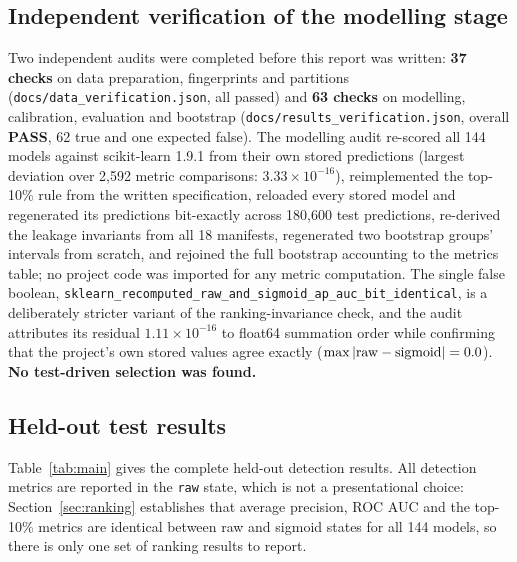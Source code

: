 \documentclass[10pt,letterpaper]{article}
\begin{document}
\subsection{Independent verification of the modelling stage}
\label{sec:audit}

Two independent audits were completed before this report was written: \textbf{37 checks} on data
preparation, fingerprints and partitions (\texttt{docs/data\_verification.json}, all passed) and
\textbf{63 checks} on modelling, calibration, evaluation and bootstrap
(\texttt{docs/results\_verification.json}, overall \textbf{PASS}, 62 true and one expected false).
The modelling audit re-scored all 144 models against scikit-learn 1.9.1 from their own stored
predictions (largest deviation over 2{,}592 metric comparisons: $3.33\times10^{-16}$), reimplemented
the top-10\% rule from the written specification, reloaded every stored model and regenerated its
predictions bit-exactly across 180{,}600 test predictions, re-derived the leakage invariants from all
18 manifests, regenerated two bootstrap groups' intervals from scratch, and rejoined the full
bootstrap accounting to the metrics table; no project code was imported for any metric computation.
The single false boolean,
\texttt{sklearn\_recomputed\_raw\_and\_sigmoid\_ap\_auc\_bit\_identical}, is a deliberately stricter
variant of the ranking-invariance check, and the audit attributes its residual $1.11\times10^{-16}$ to
float64 summation order while confirming that the project's own stored values agree exactly
($\max|{\rm raw}-{\rm sigmoid}| = 0.0$). \textbf{No test-driven selection was found.}

\subsection{Held-out test results}
\label{sec:headline}

Table~\ref{tab:main} gives the complete held-out detection results. All detection metrics are
reported in the \texttt{raw} state, which is not a presentational choice: Section~\ref{sec:ranking}
establishes that average precision, ROC AUC and the top-10\% metrics are identical between raw and
sigmoid states for all 144 models, so there is only one set of ranking results to report.
\end{document}
